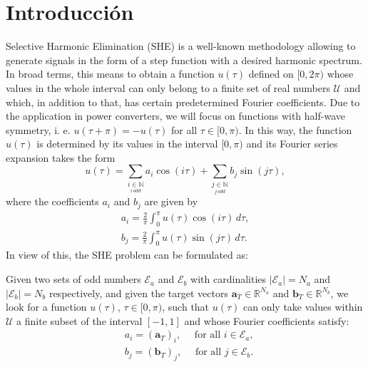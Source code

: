 
\section{Introducción} 
 

Selective Harmonic Elimination (SHE) \cite{Rodriguez2002} is a well-known methodology allowing to generate signals in the form of a step function with a desired harmonic spectrum. 
%
In broad terms, this means to obtain a function $u(\tau)$ defined on $[0,2\pi)$ whose values in the whole interval can only belong to a finite set of real numbers $\mathcal{U}$ and which, in addition to that, has certain predetermined Fourier coefficients. 
%
Due to the application in power converters, we will focus on functions with half-wave symmetry, i. e. $u(\tau + \pi) = -u(\tau)$ for all $\tau \in [0,\pi)$. In this way, the function $u(\tau)$ is determined by its values in the interval $[0,\pi)$ and its Fourier series expansion takes the form
\begin{equation}
    u(\tau ) = \sum_{\underset{i\, odd}{i \in \mathbb{N}}} a_i \cos(i\tau)+ \sum_{\underset{j\, odd}{j \in \mathbb{N}}}  b_j \sin(j \tau), 
\end{equation}
where the coefficients $a_i$ and $b_j$ are given by
\begin{equation} \label{an}
    \begin{aligned}
    a_i = \frac{2}{\pi} \int_0^\pi u(\tau ) \cos(i \tau)\,d\tau, 
    \\
    b_j = \frac{2}{\pi} \int_0^\pi u(\tau)  \sin(j \tau)\,d\tau.
    \end{aligned}
\end{equation}
In view of this, the SHE problem can be formulated as:
\newline
\begin{problem}[SHE]\label{SHEp}
Given two sets of odd numbers $\mathcal{E} _a $ and $\mathcal{E} _b $ with cardinalities $|\mathcal{E}_a| = N_a $ and $ |\mathcal{E} _b| = N_b$ respectively, and given the target vectors $\bm{a}_T \in \mathbb{R}^{N_a}$ and $\bm{b}_T \in \mathbb{R}^{N_b} $, we look for a function $u(\tau)$, $\tau \in [0,\pi)$, such that $u(\tau) $ can only take values within $\mathcal{U}$ a finite subset of the interval $[-1,1]$ and whose Fourier coefficients satisfy: 
\begin{align*}
	& a_i = (\bm{a}_T)_i, \quad\textrm{ for all } i \in \mathcal{E}_a,
	\\
	& b_j = (\bm {b}_T)_j, \quad\textrm{ for all } j \in \mathcal{E}_b.
\end{align*}
\end{problem}

